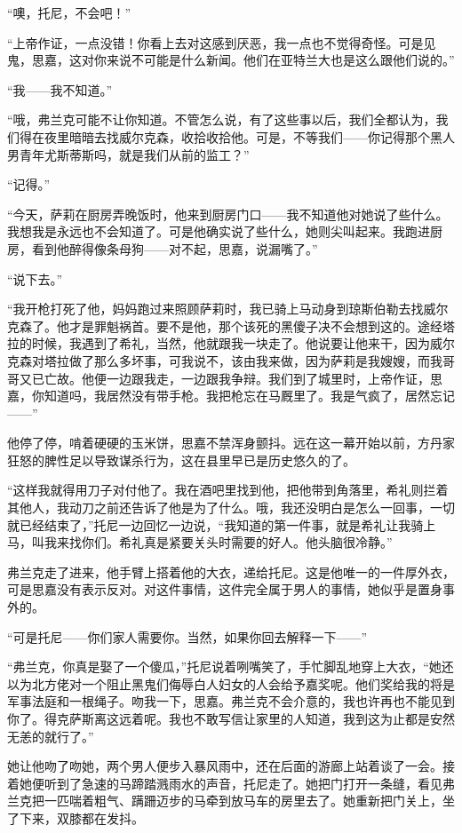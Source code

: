 \par “噢，托尼，不会吧！”
\par “上帝作证，一点没错！你看上去对这感到厌恶，我一点也不觉得奇怪。可是见鬼，思嘉，这对你来说不可能是什么新闻。他们在亚特兰大也是这么跟他们说的。”
\par “我——我不知道。”
\par “哦，弗兰克可能不让你知道。不管怎么说，有了这些事以后，我们全都认为，我们得在夜里暗暗去找威尔克森，收拾收拾他。可是，不等我们——你记得那个黑人男青年尤斯蒂斯吗，就是我们从前的监工？”
\par “记得。”
\par “今天，萨莉在厨房弄晚饭时，他来到厨房门口——我不知道他对她说了些什么。我想我是永远也不会知道了。可是他确实说了些什么，她则尖叫起来。我跑进厨房，看到他醉得像条母狗——对不起，思嘉，说漏嘴了。”
\par “说下去。”
\par “我开枪打死了他，妈妈跑过来照顾萨莉时，我已骑上马动身到琼斯伯勒去找威尔克森了。他才是罪魁祸首。要不是他，那个该死的黑傻子决不会想到这的。途经塔拉的时候，我遇到了希礼，当然，他就跟我一块走了。他说要让他来干，因为威尔克森对塔拉做了那么多坏事，可我说不，该由我来做，因为萨莉是我嫂嫂，而我哥哥又已亡故。他便一边跟我走，一边跟我争辩。我们到了城里时，上帝作证，思嘉，你知道吗，我居然没有带手枪。我把枪忘在马厩里了。我是气疯了，居然忘记——”
\par 他停了停，啃着硬硬的玉米饼，思嘉不禁浑身颤抖。远在这一幕开始以前，方丹家狂怒的脾性足以导致谋杀行为，这在县里早已是历史悠久的了。
\par “这样我就得用刀子对付他了。我在酒吧里找到他，把他带到角落里，希礼则拦着其他人，我动刀之前还告诉了他是为了什么。哦，我还没明白是怎么一回事，一切就已经结束了，”托尼一边回忆一边说，“我知道的第一件事，就是希礼让我骑上马，叫我来找你们。希礼真是紧要关头时需要的好人。他头脑很冷静。”
\par 弗兰克走了进来，他手臂上搭着他的大衣，递给托尼。这是他唯一的一件厚外衣，可是思嘉没有表示反对。对这件事情，这件完全属于男人的事情，她似乎是置身事外的。
\par “可是托尼——你们家人需要你。当然，如果你回去解释一下——”
\par “弗兰克，你真是娶了一个傻瓜，”托尼说着咧嘴笑了，手忙脚乱地穿上大衣，“她还以为北方佬对一个阻止黑鬼们侮辱白人妇女的人会给予嘉奖呢。他们奖给我的将是军事法庭和一根绳子。吻我一下，思嘉。弗兰克不会介意的，我也许再也不能见到你了。得克萨斯离这远着呢。我也不敢写信让家里的人知道，我到这为止都是安然无恙的就行了。”
\par 她让他吻了吻她，两个男人便步入暴风雨中，还在后面的游廊上站着谈了一会。接着她便听到了急速的马蹄踏溅雨水的声音，托尼走了。她把门打开一条缝，看见弗兰克把一匹喘着粗气、蹒跚迈步的马牵到放马车的房里去了。她重新把门关上，坐了下来，双膝都在发抖。
